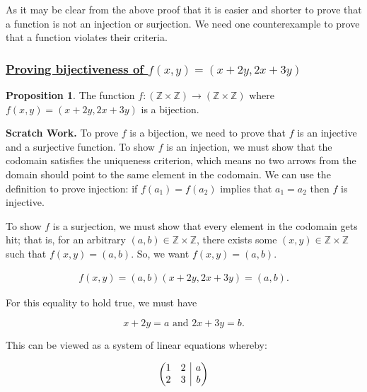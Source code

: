 \documentclass{amsart}
\theoremstyle{definition}
\theoremstyle{definition}
\newtheorem*{prpn}{Proposition}
\theoremstyle{remark}
\begin{document}
\bigskip
As it may be clear from the above proof that it is easier and shorter to prove that a function is not an injection or surjection. We need one counterexample to prove that a function violates their criteria.




\bigskip \bigskip

\subsubsection{\underline{Proving bijectiveness of $f(x,y)=(x+2y, 2x+3y)$}}\hspace*{\fill}
\medskip

\begin{prpn}
      The function $f:(\mathbb{Z}\times\mathbb{Z}) \rightarrow (\mathbb{Z}\times\mathbb{Z})$ where $f(x,y) = (x+2y, 2x+3y)$ is a bijection.
\end{prpn}

\noindent \textbf{Scratch Work.} To prove $f$ is a bijection, we need to prove that $f$ is an injective and a surjective function. To show $f$ is an injection, we must show that the codomain satisfies the uniqueness criterion, which means no two arrows from the domain should point to the same element in the codomain. We can use the definition to prove injection: if $f(a_1)=f(a_2)$ implies that $a_1=a_2$ then $f$ is injective.


To show $f$ is a surjection, we must show that every element in the codomain gets hit; that is, for an arbitrary $(a,b)\in\mathbb{Z}\times\mathbb{Z}$, there exists some $(x,y)\in\mathbb{Z}\times\mathbb{Z}$ such that $f(x,y)=(a,b)$. So, we want $f(x,y)=(a,b)$.

\begin{eqnarray*}
f(x,y) = (a,b)
(x+2y, 2x+3y) = (a,b).
\end{eqnarray*}

For this equality to hold true, we must have

\[x+2y = a \text{ and } 2x+3y = b.\]

This can be viewed as a system of linear equations whereby:

\[
\left(
      \begin{array}{@{}c|c@{}}
            \begin{matrix}
                  1 & 2 \\
                  2 & 3
            \end{matrix}
          & \begin{matrix}
                  a \\
                  b
            \end{matrix}
      \end{array}
\right)
\]
\end{document}
